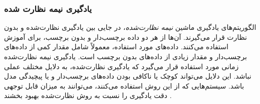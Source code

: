 \subsubsection{یادگیری نیمه نظارت شده}
الگوریتم‌های یادگیری ماشین \textit{نیمه نظارت‌شده}، در جایی بین یادگیری نظارت‌شده و بدون نظارت قرار می‌گیرند. آن‌ها از هر دو داده برچسب‌دار و بدون برچسب، برای آموزش استفاده می‌کنند. داده‌های مورد استفاده، معمولاً شامل مقدار کمی از داده‌های برچسب‌دار و مقدار زیادی از داده‌های بدون برچسب است. یادگیری نیمه نظارت‌شده زمانی مورد استفاده قرار می‌گیرد که یادگیری نظارت‌شده، به دلایل مختلف عملی نباشد. این دلایل می‌تواند کوچک یا ناکافی بودن داده‌های برچسب‌دار و یا پیچیدگی مدل باشد. سیستم‌هایی که از این روش استفاده می‌کنند، می‌توانند به میزان قابل توجهی دقت یادگیری را نسبت به روش نظارت‌شده بهبود بخشند
\cite{mldef}.
